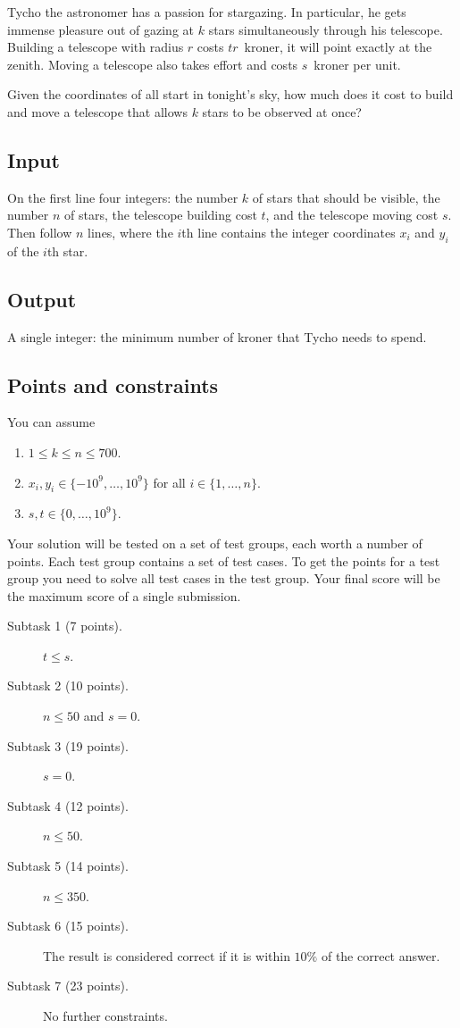 
Tycho the astronomer has a passion for stargazing.
In particular, he gets immense pleasure out of gazing at $k$ stars simultaneously through his telescope.   
Building a telescope with radius $r$ costs $tr$~kroner, it will point exactly at the zenith.
Moving a telescope also takes effort and costs $s$~kroner per unit.

Given the coordinates of all start in tonight's sky, how much does it cost to build and move a telescope that allows $k$ stars to be observed at once?

\subsection*{Input}

On the first line four integers: the number $k$ of stars that should be visible, the number $n$ of stars, the telescope building cost $t$, and the telescope moving cost $s$.
Then follow $n$ lines, where the $i$th line contains the integer coordinates $x_i$ and $y_i$ of the $i$th star.

\subsection*{Output}

A single integer: the minimum number of kroner that Tycho needs to spend.

\subsection*{Points and constraints}

You can assume 
\begin{enumerate}
\item $1\leq k\leq n\leq 700$.
\item $x_i, y_i\in \{-10^9,\ldots, 10^9\}$ for all $i\in\{1,\ldots,n\}$.
\item $s, t\in \{0,\ldots, 10^9\}$.
\end{enumerate}

Your solution will be tested on a set of test groups, each worth a number of points.
Each test group contains a set of test cases.
To get the points for a test group you need to solve all test cases in the test group.
Your final score will be the maximum score of a single submission.

\begin{description}
\item[Subtask 1 (7 points).] $t\leq s$.
\item[Subtask 2 (10 points).] $n\le 50$ and $s=0$.
\item[Subtask 3 (19 points).] $s=0$.
\item[Subtask 4 (12 points).] $n\leq 50$.
\item[Subtask 5 (14 points).] $n\leq 350$.
\item[Subtask 6 (15 points).] The result is considered correct if it is within $10\%$ of the correct answer.
\item[Subtask 7 (23 points).] No further constraints.
\end{description}
